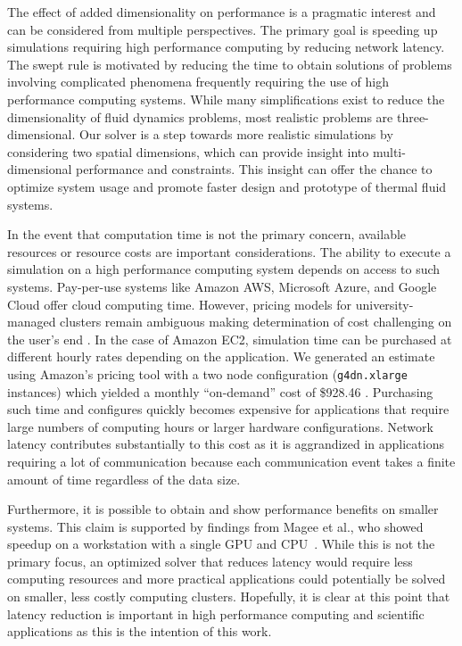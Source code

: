 \documentclass[mca,article,submit,moreauthors,pdftex]{Definitions/mdpi}
\begin{document}
The effect of added dimensionality on performance is a pragmatic interest and can be considered from multiple perspectives. The primary goal is speeding up simulations requiring high performance computing by reducing network latency. The swept rule is motivated by reducing the time to obtain solutions of problems involving complicated phenomena frequently requiring the use of high performance computing systems. While many simplifications exist to reduce the dimensionality of fluid dynamics problems, most realistic problems are three-dimensional. Our solver is a step towards more realistic simulations by considering two spatial dimensions, which can provide insight into multi-dimensional performance and constraints. This insight can offer the chance to optimize system usage and promote faster design and prototype of thermal fluid systems.

In the event that computation time is not the primary concern, available resources or resource costs are important considerations. The ability to execute a simulation on a high performance computing system depends on access to such systems. 
Pay-per-use systems like Amazon AWS, Microsoft Azure, and Google Cloud offer cloud computing time. However, pricing models for university-managed clusters remain ambiguous making determination of cost challenging on the user's end \cite{mesnard_reproducible_2019}. 
In the case of Amazon EC2, simulation time can be purchased at different hourly rates depending on the application. We generated an estimate using Amazon's pricing tool with a two node configuration (\texttt{g4dn.xlarge} instances) which yielded a monthly ``on-demand'' cost of \$928.46 \cite{amazon_web_services_amazon_nodate}. 
Purchasing such time and configures quickly becomes expensive for applications that require large numbers of computing hours or larger hardware configurations. Network latency contributes substantially to this cost as it is aggrandized in applications requiring a lot of communication because each communication event takes a finite amount of time regardless of the data size. 

Furthermore, it is possible to obtain and show performance benefits on smaller systems. This claim is supported by findings from Magee et al., who showed speedup on a workstation with a single GPU and CPU~\cite{magee_accelerating_2018}. 
While this is not the primary focus, an optimized solver that reduces latency would require less computing resources and more practical applications could potentially be solved on smaller, less costly computing clusters. 
Hopefully, it is clear at this point that latency reduction is important in high performance computing and scientific applications as this is the intention of this work.
\end{document}
